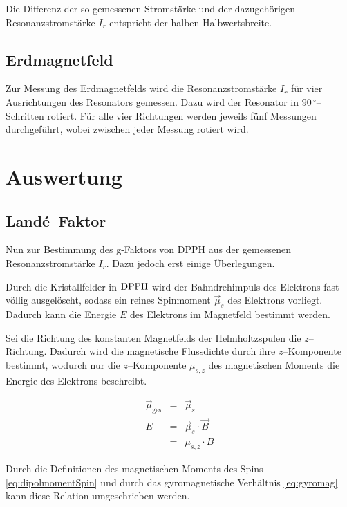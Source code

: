 \documentclass[12pt,a4paper]{scrartcl}
\numberwithin{equation}{section} %
\begin{document}
Die Differenz der so gemessenen Stromstärke und der dazugehörigen Resonanzstromstärke $I_r$ entspricht der halben Halbwertsbreite.

\subsection{Erdmagnetfeld}
\label{durchfuxfchrung:Erdmagnetfeld}
Zur Messung des Erdmagnetfelds wird die Resonanzstromstärke $I_r$ für vier Ausrichtungen des Resonators gemessen. Dazu wird der Resonator in $90 \mathrm{\, ^\circ}$--Schritten rotiert. Für alle vier Richtungen werden jeweils fünf Messungen durchgeführt, wobei zwischen jeder Messung rotiert wird.

\clearpage
\hypertarget{auswertung}{\section{Auswertung}\label{auswertung}}

\subsection{Landé--Faktor}
\label{auswertung:Landé--Faktor}

Nun zur Bestimmung des g-Faktors von DPPH aus der gemessenen Resonanzstromstärke $I_r$. Dazu jedoch erst einige Überlegungen.

Durch die Kristallfelder in $\ce{DPPH}$ wird der Bahndrehimpuls des Elektrons fast völlig ausgelöscht, sodass ein reines Spinmoment $\vec{\mu}_s$ des Elektrons vorliegt. Dadurch kann die Energie $E$ des Elektrons im Magnetfeld bestimmt werden.

Sei die Richtung des konstanten Magnetfelds der Helmholtzspulen die $z$--Richtung. Dadurch wird die magnetische Flussdichte durch ihre $z$--Komponente bestimmt, wodurch nur die $z$--Komponente $\mu_{s,z}$ des magnetischen Moments die Energie des Elektrons beschreibt.

\begin{eqnarray}
	\vec{\mu}_\mathrm{ges} &=& \vec{\mu}_s \\
	E &=& \vec{\mu}_s \cdot \vec{B} \\
		&=& \mu_{s,z} \cdot B
\end{eqnarray}

\noindent
Durch die Definitionen des magnetischen Moments des Spins \eqref{eq:dipolmomentSpin} und durch das gyromagnetische Verhältnis \eqref{eq:gyromag} kann diese Relation umgeschrieben werden.
\end{document}
